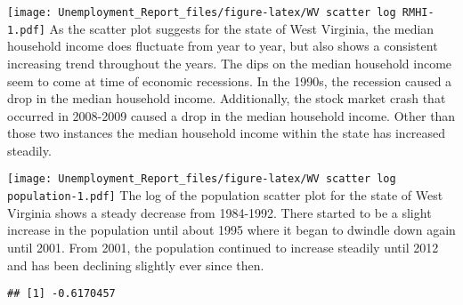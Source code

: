 \documentclass[
]{article}
\newenvironment{Shaded}{\begin{snugshade}}{\end{snugshade}}
\newcommand{\CommentTok}[1]{\textcolor[rgb]{0.56,0.35,0.01}{\textit{#1}}}
\newcommand{\DataTypeTok}[1]{\textcolor[rgb]{0.13,0.29,0.53}{#1}}
\newcommand{\DecValTok}[1]{\textcolor[rgb]{0.00,0.00,0.81}{#1}}
\newcommand{\KeywordTok}[1]{\textcolor[rgb]{0.13,0.29,0.53}{\textbf{#1}}}
\newcommand{\NormalTok}[1]{#1}
\newcommand{\OperatorTok}[1]{\textcolor[rgb]{0.81,0.36,0.00}{\textbf{#1}}}
\newcommand{\StringTok}[1]{\textcolor[rgb]{0.31,0.60,0.02}{#1}}
\begin{document}
\texttt{[image: Unemployment\_Report\_files/figure-latex/WV scatter log RMHI-1.pdf]}
As the scatter plot suggests for the state of West Virginia, the median
household income does fluctuate from year to year, but also shows a
consistent increasing trend throughout the years. The dips on the median
household income seem to come at time of economic recessions. In the
1990s, the recession caused a drop in the median household income.
Additionally, the stock market crash that occurred in 2008-2009 caused a
drop in the median household income. Other than those two instances the
median household income within the state has increased steadily.

\begin{Shaded}
\end{Shaded}

\texttt{[image: Unemployment\_Report\_files/figure-latex/WV scatter log population-1.pdf]}
The log of the population scatter plot for the state of West Virginia
shows a steady decrease from 1984-1992. There started to be a slight
increase in the population until about 1995 where it began to dwindle
down again until 2001. From 2001, the population continued to increase
steadily until 2012 and has been declining slightly ever since then.

\begin{Shaded}
\end{Shaded}

\begin{verbatim}
## [1] -0.6170457
\end{verbatim}

\begin{Shaded}
\end{Shaded}
\end{document}
